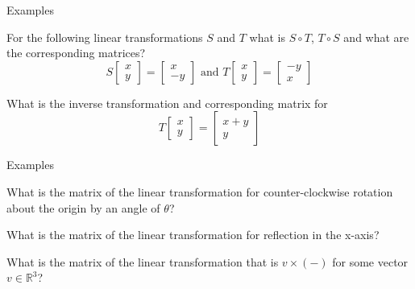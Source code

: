 \documentclass{beamer}
\begin{document}
\begin{frame}{Examples}
\begin{example}
For the following linear transformations $S$ and $T$ what is $S\circ T$, $T\circ S$ and what are the corresponding matrices?
\begin{equation*}
S \left[
\begin{array}{c}
x\\
y
\end{array}
\right] = \left[
\begin{array}{c}
x\\
-y
\end{array}
\right]\text{ and } T \left[
\begin{array}{c}
x\\
y
\end{array}
\right] = \left[
\begin{array}{c}
-y\\
x
\end{array}
\right]
\end{equation*}
\end{example}
\begin{example}
What is the inverse transformation and corresponding matrix for
\begin{equation*}
T \left[
\begin{array}{c}
x\\
y
\end{array}
\right] = \left[
\begin{array}{c}
x+y\\
y
\end{array}
\right]
\end{equation*}
\end{example}
\end{frame}

\begin{frame}{Examples}
\begin{example}
What is the matrix of the linear transformation for counter-clockwise rotation about the origin by an angle of $\theta$?
\end{example}
\begin{example}
What is the matrix of the linear transformation for reflection in the x-axis?
\end{example}
\begin{example}
What is the matrix of the linear transformation that is $v\times (-)$ for some vector $v\in \mathbb{R}^3$?
\end{example}
\end{frame}
\end{document}
